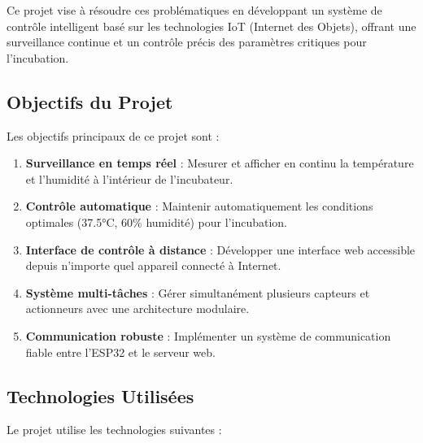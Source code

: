 \documentclass[12pt,a4paper]{article}
\begin{document}
Ce projet vise à résoudre ces problématiques en développant un système de contrôle intelligent basé sur les technologies IoT (Internet des Objets), offrant une surveillance continue et un contrôle précis des paramètres critiques pour l'incubation.

\subsection{Objectifs du Projet}
Les objectifs principaux de ce projet sont :

\begin{enumerate}[label=\textbf{\arabic*.}]
    \item \textbf{Surveillance en temps réel} : Mesurer et afficher en continu la température et l'humidité à l'intérieur de l'incubateur.
    \item \textbf{Contrôle automatique} : Maintenir automatiquement les conditions optimales (37.5°C, 60\% humidité) pour l'incubation.
    \item \textbf{Interface de contrôle à distance} : Développer une interface web accessible depuis n'importe quel appareil connecté à Internet.
    \item \textbf{Système multi-tâches} : Gérer simultanément plusieurs capteurs et actionneurs avec une architecture modulaire.
    \item \textbf{Communication robuste} : Implémenter un système de communication fiable entre l'ESP32 et le serveur web.
\end{enumerate}

\subsection{Technologies Utilisées}
Le projet utilise les technologies suivantes :
\end{document}
